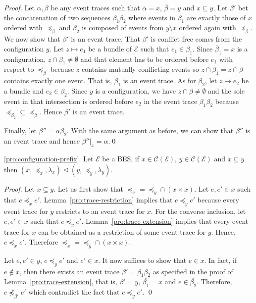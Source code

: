 \documentclass{llncs}
\newcommand{\C}{\mathcal{C}}
\newcommand{\EE}{\mathcal{E}}
\newcommand{\prefix}{\trianglelefteq}
\newcommand{\<}{\langle}
\renewcommand{\>}{\rangle}
\newcommand{\ov}[1]{\overline{#1}}
\begin{document}
\begin{proof}
Let $\alpha,\beta$ be any event traces such that $\ov\alpha = x$, $\ov{\beta} = y$ and $x\subseteq y$. Let $\beta'$ bet the concatenation of two sequences $\beta_1\beta_2$ where events in $\beta_1$ are exactly those of $x$ ordered with $\preceq_\beta$ and $\beta_2$ is composed of events from $y\setminus x$ ordered again with $\preceq_\beta$. We now show that $\beta'$ is an event trace. That $\beta'$ is conflict free comes from the configuration $y$. Let $z\mapsto e_1$ be a bundle of $\EE$ such that $e_1\in \beta_1$. Since $\ov\beta_1 = x$ is a configuration, $z\cap \beta_1\neq\emptyset$ and that element has to be ordered before $e_1$ with respect to $\preceq_\beta$ because $z$ contains mutually conflicting events so $z\cap\beta_1 = z\cap\beta$ contains exactly one event. That is, $\beta_1$ is an event trace. As for $\beta_2$, let $z\mapsto e_2$ be a bundle and $e_2\in\beta_2$. Since $y$ is a configuration, we have $z\cap\beta\neq\emptyset$ and the sole event in that intersection is ordered before $e_2$ in the event trace $\beta_1\beta_2$ because $\preceq_{\beta_2}\subseteq\preceq_\beta$. Hence $\beta'$ is an event trace. 

Finally, let $\beta'' = \alpha\beta_2$. With the same argument as before, we can show that $\beta''$ is an event trace and hence $\beta''|_{x} = \alpha$.\qed
\end{proof}

\begin{repproposition}{\ref{pro:configuration-prefix}.}
Let $\EE$ be a BES, if $x\in\C(\EE)$, $y\in\C(\EE)$ and $x\subseteq y$ then $(x,\preceq_x,\lambda_x)\prefix (y,\preceq_y,\lambda_y)$.
\end{repproposition}

\begin{proof}
Let $x\subseteq y$. Let us first show that $\preceq_x = \preceq_y\cap(x\times x)$. Let $e,e'\in x$ such that  $e\preceq_xe'$. Lemma~\ref{pro:trace-restriction} implies that $e\preceq_y e'$ because every event trace for $y$ restricts to an event trace for $x$. For the converse inclusion, let $e,e'\in x$ such that $e\preceq_ye'$. Lemma~\ref{pro:trace-extension} implies that every event trace for $x$ can be obtained as a restriction of some event trace for $y$. Hence, $e\preceq_x e'$. Therefore $\preceq_x = \preceq_y\cap(x\times x)$.

Let $e,e'\in y$, $e\preceq_y e'$ and $e'\in x$. It now suffices to show that $e\in x$. In fact, if $e\notin x$, then there exists an event trace $\beta' = \beta_1\beta_2$ as specified in the proof of Lemma~\ref{pro:trace-extension}, that is, $\ov{\beta'} = y$, $\ov{\beta_1} = x$ and $e\in\ov{\beta_2}$. Therefore, $e\npreceq_{\beta'} e'$ which contradict the fact that $e\preceq_ye'$. \qed
\end{proof}
\end{document}
